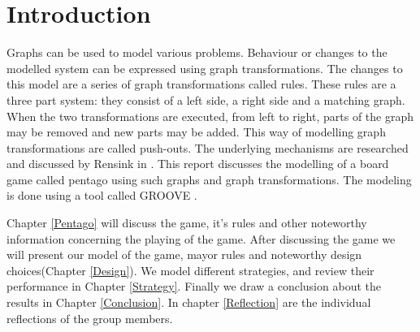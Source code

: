 \section{Introduction}
\label{Introduction}
Graphs can be used to model various problems.
Behaviour or changes to the modelled system can be expressed using graph transformations.
The changes to this model are a series of graph transformations called rules.
These rules are a three part system: they consist of a left side, a right side and a matching graph.
When the two transformations are executed, from left to right, parts of the graph may be removed and new parts may be added.
This way of modelling graph transformations are called push-outs.
The underlying mechanisms are researched and discussed by Rensink in \cite{Rensink2006}.
This report discusses the modelling of a board game called pentago using such graphs and graph transformations. 
The modeling is done using a tool called GROOVE \cite{tool-groove}.

\vspace{6pt}

Chapter \ref{Pentago} will discuss the game, it's rules and other noteworthy information concerning the playing of the game. 
After discussing the game we will present our model of the game, mayor rules and noteworthy design choices(Chapter \ref{Design}).
We model different strategies, and review their performance in Chapter \ref{Strategy}. Finally we draw a conclusion about the results in Chapter \ref{Conclusion}.
In chapter \ref{Reflection} are the individual reflections of the group members.